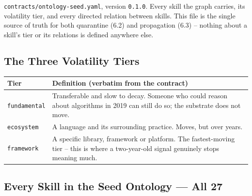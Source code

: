 \documentclass[10pt,a4paper]{article}
\begin{document}
\texttt{contracts/ontology-seed.yaml}, version \texttt{0.1.0}. Every skill
the graph carries, its volatility tier, and every directed relation between
skills. This file is the single source of truth for both quarantine (6.2)
and propagation (6.3) -- nothing about a skill's tier or its relations is
defined anywhere else.

\subsection{The Three Volatility Tiers}

\begin{center}
\small
\begin{tabular}{@{}lL{10.5cm}@{}}
\toprule
\textbf{Tier} & \textbf{Definition (verbatim from the contract)} \\
\midrule
\texttt{fundamental} & Transferable and slow to decay. Someone who could reason about algorithms in 2019 can still do so; the substrate does not move. \\
\texttt{ecosystem}   & A language and its surrounding practice. Moves, but over years. \\
\texttt{framework}   & A specific library, framework or platform. The fastest-moving tier -- this is where a two-year-old signal genuinely stops meaning much. \\
\bottomrule
\end{tabular}
\end{center}

\subsection{Every Skill in the Seed Ontology --- All 27}
\end{document}

